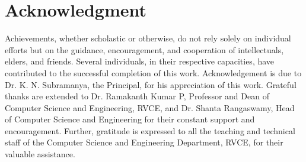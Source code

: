 
\section*{Acknowledgment}

Achievements, whether scholastic or otherwise, do not rely solely on individual efforts but on the guidance, encouragement, and cooperation of intellectuals, elders, and friends. Several individuals, in their respective capacities, have contributed to the successful completion of this work. Acknowledgement is due to Dr. K. N. Subramanya, the Principal, for his appreciation of this work. Grateful thanks are extended to Dr. Ramakanth Kumar P, Professor and Dean of Computer Science and Engineering, RVCE, and Dr. Shanta Rangaswamy, Head of Computer Science and Engineering for their constant support and encouragement. Further, gratitude is expressed to all the teaching and technical staff of the Computer Science and Engineering Department, RVCE, for their valuable assistance.
